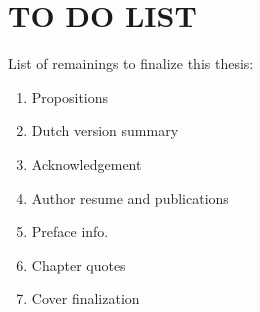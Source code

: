 \chapter*{TO DO LIST} %

List of remainings to finalize this thesis:
\begin{enumerate}
    \item Propositions 
    \item Dutch version summary
    \item Acknowledgement
    \item Author resume and publications
    \item Preface info. 
    \item Chapter quotes
    \item Cover finalization
\end{enumerate}
